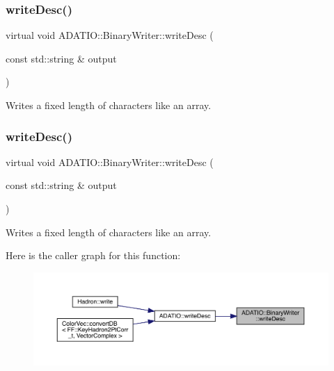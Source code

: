 \subsubsection{\texorpdfstring{writeDesc()}{writeDesc()}\hspace{0.1cm}{\footnotesize\ttfamily [2/3]}}
{\footnotesize\ttfamily virtual void A\+D\+A\+T\+I\+O\+::\+Binary\+Writer\+::write\+Desc (\begin{DoxyParamCaption}\item[{const std\+::string \&}]{output }\end{DoxyParamCaption})\hspace{0.3cm}{\ttfamily [virtual]}}



Writes a fixed length of characters like an array. 

\mbox{\label{classADATIO_1_1BinaryWriter_a616c82aa0768386f730781d4e8552328}} 
\subsubsection{\texorpdfstring{writeDesc()}{writeDesc()}\hspace{0.1cm}{\footnotesize\ttfamily [3/3]}}
{\footnotesize\ttfamily virtual void A\+D\+A\+T\+I\+O\+::\+Binary\+Writer\+::write\+Desc (\begin{DoxyParamCaption}\item[{const std\+::string \&}]{output }\end{DoxyParamCaption})\hspace{0.3cm}{\ttfamily [virtual]}}



Writes a fixed length of characters like an array. 

Here is the caller graph for this function\+:
\nopagebreak
\begin{figure}[H]
\begin{center}
\leavevmode
\includegraphics[width=350pt]{db/dee/classADATIO_1_1BinaryWriter_a616c82aa0768386f730781d4e8552328_icgraph}
\end{center}
\end{figure}
\mbox{\label{classADATIO_1_1BinaryWriter_a4415e2d04de75ea6310a8eed3be8f43e}} 
